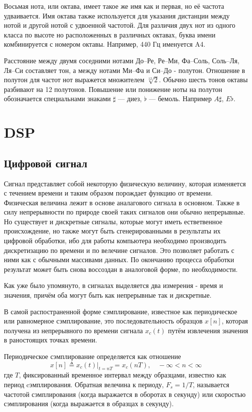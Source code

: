 \documentclass[oneside, final, 12pt]{extarticle}
\begin{document}
  Восьмая нота, или октава, имеет такое же имя как и первая, но её частота
  удваивается. Имя октава также используется для указания дистанции между
  нотой и другой нотой с удвоенной частотой. Для различия двух нот из одного
  класса по высоте но расположенных в различных октавах, буква имени
  комбинируется с номером октавы. Например, 440 Гц именуется A4.

  Расстояние между двумя соседними нотами До--Ре, Ре--Ми, Фа--Соль, Соль--Ля,
  Ля--Си составляет тон, а между нотами Ми--Фа и Си--До - полутон. Отношение
  в полутон для частот нот выражется множителем $\sqrt[12]{2}$. Обычно
  шесть тонов октавы разбивают на 12 полутонов. Повышение или понижение
  ноты на полутон обозначается специальнами знаками $\sharp$ --- диез,
  $\flat$ --- бемоль. Например $A\sharp$, $E\flat$.

\cleardoublepage

\section{DSP}

\subsection{Цифровой сигнал}
  Сигнал представляет собой некоторую физическую величину, которая
  изменяется с течением времени и таким образом порождает функцию
  от времени. Физическая величина лежит в основе аналагового сигнала
  в основном. Также в силу непрерывности по природе своей таких сигналов
  они обычно непрерывные. Но существует и дискретные сигналы, которые
  могут иметь естветвенное происхождение, но также могут быть
  сгенерированными в результаты их цифровой обработки, ибо
  для работы компьютера необходимо производить дискретизацию по времени
  и по велечине сигналов. Это позволяет работать с ними как с обычными
  массивами данных. По окончанию процесса обработки результат может
  быть снова воссоздан в аналоговой форме, по необходимости.

  Как уже было упомянуто, в сигналах выделяется два измерения - время и
  значения, причём оба могут быть как непрерывные так и дискретные.

  В самой распостраненной форме сэмплирование, известное как периодическое
  или равномерное сэмплирование, это последовательность образцов
  $x[n]$, которая получена из непрерывного по времени сигнала
  $x_c(t)$ путём извлечения значения в раностоящих точках времени.

  Периодическое сэмплирование определяется как отношение
  \[
    x[n] \triangleq x_c(t) \left. \right|_{t=nT} = x_c(nT), \quad
    - \infty < n < \infty
  \]
  где $T$, фиксированный временное интервал между образцами, известно
  как период cэмплирования. Обратная велечина к периоду, $F_s = 1 / T$,
  называется частотой сэмплирования (когда выражается в оборотах в секунду)
  или скоростью сэмплирования (когда выражается в образцах в секунду).
\end{document}
